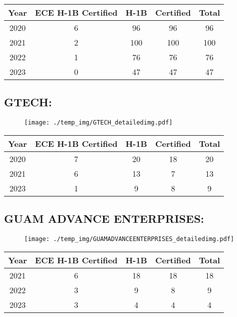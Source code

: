 \documentclass{article}%
\begin{document}
%
\begin{longtable}{c|c|c|c|c}%
\hline%
Year&ECE H{-}1B Certified&H{-}1B&Certified&Total\\%
\hline%
2020&6&96&96&96\\%
\hline%
2021&2&100&100&100\\%
\hline%
2022&1&76&76&76\\%
\hline%
2023&0&47&47&47\\%
\hline%
\end{longtable}

%
\newpage%
\subsection{GTECH:}%
\label{subsec:GTECH}%
\label{GTECHdetailed}%


\begin{figure}[htbp]%
\centering%
\texttt{[image: ./temp\_img/GTECH\_detailedimg.pdf]}%
\end{figure}

%
\begin{longtable}{c|c|c|c|c}%
\hline%
Year&ECE H{-}1B Certified&H{-}1B&Certified&Total\\%
\hline%
2020&7&20&18&20\\%
\hline%
2021&6&13&7&13\\%
\hline%
2023&1&9&8&9\\%
\hline%
\end{longtable}

%
\newpage%
\subsection{GUAM ADVANCE ENTERPRISES:}%
\label{subsec:GUAMADVANCEENTERPRISES}%
\label{GUAMADVANCEENTERPRISESdetailed}%


\begin{figure}[htbp]%
\centering%
\texttt{[image: ./temp\_img/GUAMADVANCEENTERPRISES\_detailedimg.pdf]}%
\end{figure}

%
\begin{longtable}{c|c|c|c|c}%
\hline%
Year&ECE H{-}1B Certified&H{-}1B&Certified&Total\\%
\hline%
2021&6&18&18&18\\%
\hline%
2022&3&9&8&9\\%
\hline%
2023&3&4&4&4\\%
\hline%
\end{longtable}
\end{document}
